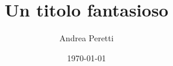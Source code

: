\documentclass[a4paper,12pt,italian,twoside]{book}   	%
\title{Un titolo fantasioso}
\author{Andrea Peretti}
\date{\today}							%
\begin{document}
\maketitle
\tableofcontents











\nocite{*}
\end{document}
